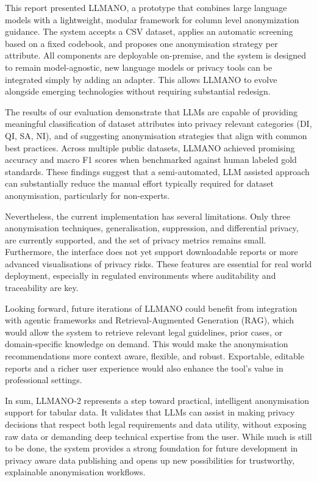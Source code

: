 \documentclass{article}
\begin{document}
This report presented LLMANO, a prototype that combines large language models with a lightweight, modular framework for column level anonymization guidance. The system accepts a CSV dataset, applies an automatic screening based on a fixed codebook, and proposes one anonymisation strategy per attribute. All components are deployable on-premise, and the system is designed to remain model-agnostic, new language models or privacy tools can be integrated simply by adding an adapter. This allows LLMANO to evolve alongside emerging technologies without requiring substantial redesign.

The results of our evaluation demonstrate that LLMs are capable of providing meaningful classification of dataset attributes into privacy relevant categories (DI, QI, SA, NI), and of suggesting anonymisation strategies that align with common best practices. Across multiple public datasets, LLMANO achieved promising accuracy and macro F1 scores when benchmarked against human labeled gold standards. These findings suggest that a semi-automated, LLM assisted approach can substantially reduce the manual effort typically required for dataset anonymisation, particularly for non-experts.

Nevertheless, the current implementation has several limitations. Only three anonymisation techniques, generalisation, suppression, and differential privacy, are currently supported, and the set of privacy metrics remains small. Furthermore, the interface does not yet support downloadable reports or more advanced visualisations of privacy risks. These features are essential for real world deployment, especially in regulated environments where auditability and traceability are key.

Looking forward, future iterations of LLMANO could benefit from integration with agentic frameworks and Retrieval-Augmented Generation (RAG), which would allow the system to retrieve relevant legal guidelines, prior cases, or domain-specific knowledge on demand. This would make the anonymisation recommendations more context aware, flexible, and robust. Exportable, editable reports and a richer user experience would also enhance the tool’s value in professional settings.

In sum, LLMANO-2 represents a step toward practical, intelligent anonymisation support for tabular data. It validates that LLMs can assist in making privacy decisions that respect both legal requirements and data utility, without exposing raw data or demanding deep technical expertise from the user. While much is still to be done, the system provides a strong foundation for future development in privacy aware data publishing and opens up new possibilities for trustworthy, explainable anonymisation workflows.
\end{document}
